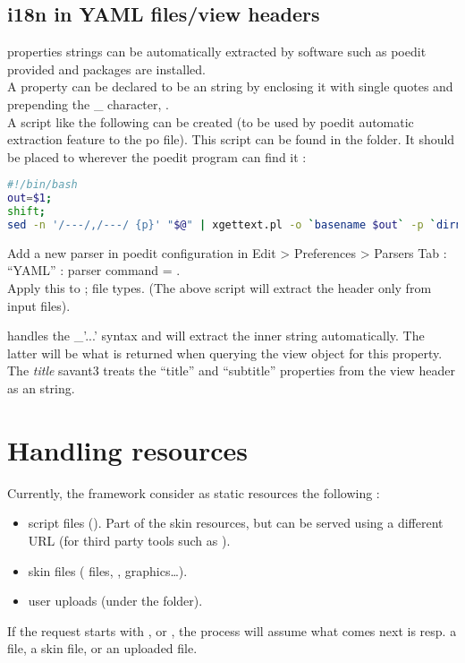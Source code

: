 \documentclass[pdftex,12pt,a4paper]{article}
\begin{document}
\subsection{i18n in YAML files/view headers} \label{sec:i18n-yaml}
 properties  strings can be automatically extracted by software such as poedit provided  and  packages are installed.\\
A  property can be declared to be an  string by enclosing it with single quotes and prepending the \_ character, \eg {}.\\
A script like the following can be created (to be used by poedit automatic extraction feature to the po file). This script can be found in the  folder. It should be placed to wherever the poedit program can find it :
\begin{lstlisting}[label=poedit-yaml-i18n-extract-script,caption="Script to extract i18n strings from YAML by poedit",language=bash]
#!/bin/bash
out=$1;
shift;
sed -n '/---/,/---/ {p}' "$@" | xgettext.pl -o `basename $out` -p `dirname $out` -P yaml=*
\end{lstlisting}
Add a new  parser in poedit configuration in Edit > Preferences > Parsers Tab :\\
``YAML'' : parser command = .\\
Apply this to ;  file types. (The above script will extract the  header only from input files).

 handles the \_'...' syntax and will extract the inner string automatically. The latter will be what is returned when querying the view object for this property.\\
The \emph{title} savant3  treats the ``title'' and ``subtitle'' properties from the view  header as an  string.

\section{Handling resources} \label{sec:handling-resources}

Currently, the framework consider as static resources the following :
\begin{itemize}
	\item script files (\eg {}). Part of the skin resources, but can be served using a different URL (for third party  tools such as ).
	\item skin files (\eg {} files, , graphics\ldots).
	\item user uploads (under the  folder).
\end{itemize}
If the request starts with ,  or , the process will assume what comes next is resp. a  file, a skin file, or an uploaded file.
\end{document}
